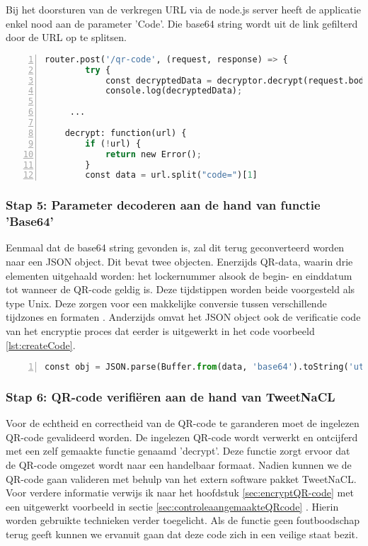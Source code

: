 Bij het doorsturen van de verkregen URL via de node.js server heeft de applicatie enkel nood aan de parameter 'Code'\autocite{Weir2012}.  Die base64 string wordt uit de link gefilterd door de URL op te splitsen. 

\begin{lstlisting}[language=Python, caption={Python script om parameter code uit de link te halen.}, label={lst:pythonLinkSplitting}, numbers=left]
    router.post('/qr-code', (request, response) => {
        try {
            const decryptedData = decryptor.decrypt(request.body.tag);
            console.log(decryptedData);
            
     ...
    
    decrypt: function(url) {
        if (!url) {
            return new Error();
        }
        const data = url.split("code=")[1]
\end{lstlisting}

\subsubsection{Stap 5: Parameter decoderen aan de hand van functie 'Base64'}
Eenmaal dat de base64 string gevonden is, zal dit terug geconverteerd worden naar een \ac{JSON} object. Dit bevat twee objecten. Enerzijds QR-data, waarin drie elementen uitgehaald worden: het lockernummer alsook de begin- en einddatum tot wanneer de QR-code geldig is. Deze tijdstippen worden beide voorgesteld als type Unix. Deze zorgen voor een makkelijke conversie tussen verschillende tijdzones en formaten \autocite{Ritchie1978}. Anderzijds omvat het \ac{JSON} object ook de verificatie code van het encryptie proces dat eerder is uitgewerkt in het code voorbeeld \ref{lst:createCode}. 

\begin{lstlisting}[language=Python, caption={Python code om parameter code te decoderen en informatie op te halen uit het object.}, label={lst:pythonLinkSplitting}, numbers=left]
    const obj = JSON.parse(Buffer.from(data, 'base64').toString('utf8')); 
\end{lstlisting}

\subsubsection{Stap 6: QR-code verifiëren aan de hand van TweetNaCL}

Voor de echtheid en correctheid van de QR-code te garanderen moet de ingelezen QR-code gevalideerd worden. De ingelezen QR-code wordt verwerkt en ontcijferd met een zelf gemaakte functie genaamd 'decrypt'. Deze functie zorgt ervoor dat de QR-code omgezet wordt naar een handelbaar formaat. Nadien kunnen we de QR-code gaan valideren met behulp van het extern software pakket TweetNaCL. Voor verdere informatie verwijs ik naar het hoofdstuk \ref{sec:encryptQR-code} met een uitgewerkt voorbeeld in sectie \ref{sec:controleaangemaakteQRcode} . Hierin worden gebruikte technieken verder toegelicht. Als de functie geen foutboodschap terug geeft kunnen we ervanuit gaan dat deze code zich in een veilige staat bezit.

